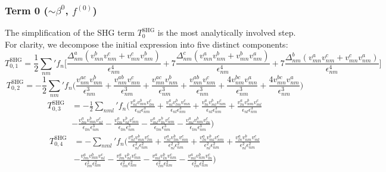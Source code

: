 \documentclass[twocolumn, prx, reprint, amsfonts, amsmath, amssymb, longbibliography, floatfix, aps]{revtex4-2}
\begin{document}
\subsubsection*{Term 0 (\texorpdfstring{$\sim \beta^0$}{beta0}, \texorpdfstring{$f^{(0)}$}{f0})}
	The simplification of the SHG term $T^{\text{SHG}}_0$ is the most analytically involved step. For clarity, we decompose the initial expression into five distinct components:
\begin{equation}
	T^{\text{SHG}}_{0, 1} = \frac{1}{2} {\textstyle \sum_{nm}'} f_n  \Big[\frac{\Delta_{nm}^a (v^b_{mn}v^c_{nm} + v^c_{mn}v^b_{nm})}{\epsilon^4_{nm}} + 7\frac{\Delta_{nm}^c (v^a_{mn}v^b_{nm} + v^b_{mn}v^a_{nm})}{\epsilon^4_{nm}} + 7\frac{\Delta_{nm}^b (v^a_{mn}v^c_{nm} + v^c_{mn}v^a_{nm})}{\epsilon^4_{nm}}\Big]
\end{equation}
\begin{equation}
	T^{\text{SHG}}_{0, 2} = -\frac{1}{2} {\textstyle \sum_{nm}'} f_n  \Big(\frac{v^{ac}_{nm}v^b_{mn}}{\epsilon_{nm}^3} + \frac{v^{ab}_{nm}v^c_{mn}}{\epsilon_{nm}^3} + \frac{v^{ac}_{mn}v^b_{nm}}{\epsilon_{nm}^3} + 
	\frac{v^{ab}_{mn}v^c_{nm}}{\epsilon_{nm}^3} + 
	\frac{4v^{bc}_{nm}v^a_{mn}}{\epsilon_{nm}^3} + 
	\frac{4v^{bc}_{mn}v^a_{nm}}{\epsilon_{nm}^3}\Big) 
\end{equation}
\begin{equation}
	\begin{aligned}
		T^{\text{SHG}}_{0, 3} &= -\frac{1}{2} {\textstyle \sum_{nml}'} f_n \Big( \frac{v^{a}_{nl}v^b_{mn}v^c_{lm}}{\epsilon_{nl}\epsilon^3_{nm}} + \frac{v^{a}_{nl}v^b_{lm}v^c_{mn}}{\epsilon_{nl}\epsilon^3_{nm}} + 
		\frac{v^{a}_{ln}v^b_{ml}v^c_{nm}}{\epsilon_{nl}\epsilon^3_{nm}} + 
		\frac{v^{a}_{ln}v^b_{nm}v^c_{ml}}{\epsilon_{nl}\epsilon^3_{nm}}  \\
		&- \frac{v^{a}_{lm}v^b_{mn}v^c_{nl}}{\epsilon_{lm}\epsilon^3_{nm}} - \frac{v^{a}_{lm}v^b_{nl}v^c_{mn}}{\epsilon_{lm}\epsilon^3_{nm}} - 
		\frac{v^{a}_{ml}v^b_{ln}v^c_{nm}}{\epsilon_{lm}\epsilon^3_{nm}} - 
		\frac{v^{a}_{ml}v^b_{nm}v^c_{ln}}{\epsilon_{lm}\epsilon^3_{nm}}  \Big)
	\end{aligned}
\end{equation}
\begin{equation}
	\begin{aligned}
		T^{\text{SHG}}_{0, 4} &=   - {\textstyle \sum_{nml}'} f_n \Big( \frac{v^{a}_{nl}v^b_{mn}v^c_{lm}}{\epsilon^2_{nl}\epsilon^2_{nm}} + \frac{v^{a}_{nl}v^b_{lm}v^c_{mn}}{\epsilon^2_{nl}\epsilon^2_{nm}} + 
		\frac{v^{a}_{ln}v^b_{ml}v^c_{nm}}{\epsilon^2_{nl}\epsilon^2_{nm}} + 
		\frac{v^{a}_{ln}v^b_{nm}v^c_{ml}}{\epsilon^2_{nl}\epsilon^2_{nm}}  \\
		&- \frac{v^{a}_{lm}v^b_{mn}v^c_{nl}}{\epsilon^2_{lm}\epsilon^2_{nm}} - \frac{v^{a}_{lm}v^b_{nl}v^c_{mn}}{\epsilon^2_{lm}\epsilon^2_{nm}} - 
		\frac{v^{a}_{ml}v^b_{ln}v^c_{nm}}{\epsilon^2_{lm}\epsilon^2_{nm}} - 
		\frac{v^{a}_{ml}v^b_{nm}v^c_{ln}}{\epsilon^2_{lm}\epsilon^2_{nm}}  \Big)
	\end{aligned}
\end{equation}
\end{document}
